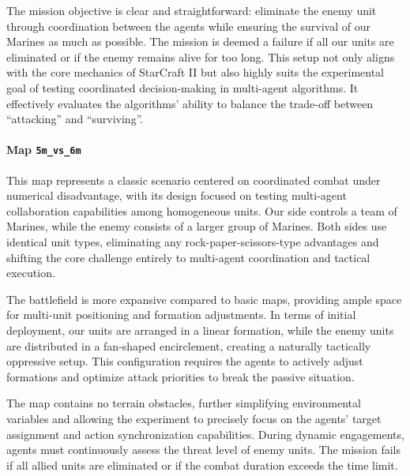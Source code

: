 The mission objective is clear and straightforward: eliminate the enemy unit through coordination between the agents while ensuring the survival of our Marines as much as possible. The mission is deemed a failure if all our units are eliminated or if the enemy remains alive for too long. This setup not only aligns with the core mechanics of StarCraft II but also highly suits the experimental goal of testing coordinated decision-making in multi-agent algorithms. It effectively evaluates the algorithms' ability to balance the trade-off between ``attacking'' and ``surviving''.

\paragraph{Map \texttt{5m\_vs\_6m}} 
This map represents a classic scenario centered on coordinated combat under numerical disadvantage, with its design focused on testing multi-agent collaboration capabilities among homogeneous units. Our side controls a team of Marines, while the enemy consists of a larger group of Marines. Both sides use identical unit types, eliminating any rock-paper-scissors-type advantages and shifting the core challenge entirely to multi-agent coordination and tactical execution.

The battlefield is more expansive compared to basic maps, providing ample space for multi-unit positioning and formation adjustments. In terms of initial deployment, our units are arranged in a linear formation, while the enemy units are distributed in a fan-shaped encirclement, creating a naturally tactically oppressive setup. This configuration requires the agents to actively adjust formations and optimize attack priorities to break the passive situation.

The map contains no terrain obstacles, further simplifying environmental variables and allowing the experiment to precisely focus on the agents' target assignment and action synchronization capabilities. During dynamic engagements, agents must continuously assess the threat level of enemy units. The mission fails if all allied units are eliminated or if the combat duration exceeds the time limit.

